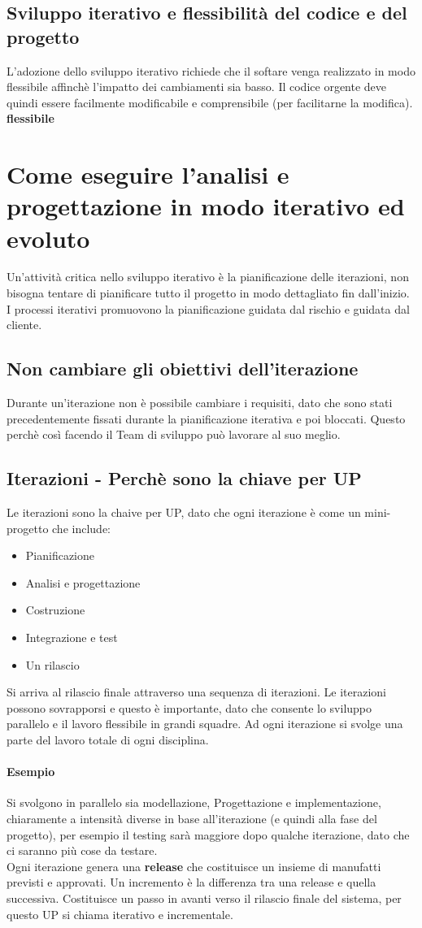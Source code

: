 \subsection{Sviluppo iterativo e flessibilità del codice e del progetto}
L'adozione dello sviluppo iterativo richiede che il softare venga realizzato in modo flessibile
affinchè l'impatto dei cambiamenti sia basso. Il codice orgente deve quindi essere facilmente
modificabile e comprensibile (per facilitarne la modifica).
\textbf{flessibile}
\section{Come eseguire l'analisi e progettazione in modo iterativo
ed evoluto}
Un'attività critica nello sviluppo iterativo è la pianificazione delle iterazioni,
non bisogna tentare di pianificare tutto il progetto in modo dettagliato fin dall'inizio.
I processi iterativi promuovono la pianificazione guidata dal rischio e guidata dal cliente.
\subsection{Non cambiare gli obiettivi dell'iterazione}
Durante un'iterazione non è possibile cambiare i requisiti, dato che sono stati
precedentemente fissati durante la pianificazione iterativa e poi bloccati.
Questo perchè così facendo il Team di sviluppo può lavorare al suo meglio.
\subsection{Iterazioni - Perchè sono la chiave per UP}
Le iterazioni sono la chaive per UP, dato che ogni iterazione è come un mini-progetto 
che include:
\begin{itemize}
    \item Pianificazione
    \item Analisi e progettazione
    \item Costruzione
    \item Integrazione e test
    \item Un rilascio
\end{itemize}
Si arriva al rilascio finale attraverso una sequenza di iterazioni.
Le iterazioni possono sovrapporsi e questo è importante, dato che consente lo
sviluppo parallelo e il lavoro flessibile in grandi squadre.
Ad ogni iterazione si svolge una parte del lavoro totale di ogni disciplina.
\paragraph*{Esempio} Si svolgono in parallelo sia modellazione, Progettazione
 e implementazione, chiaramente a intensità diverse in base all'iterazione (e quindi
 alla fase del progetto), per esempio il testing sarà maggiore dopo qualche iterazione, 
 dato che ci saranno più cose da testare.
 \\ Ogni iterazione genera una \textbf{release} che costituisce un insieme di manufatti
 previsti e approvati. Un incremento è la differenza tra una release e quella successiva.
 Costituisce un passo in avanti verso il rilascio finale del sistema, per questo UP si chiama
 iterativo e incrementale.
